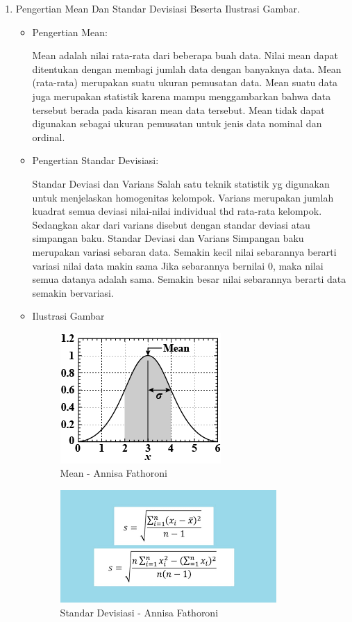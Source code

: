 \begin{enumerate}
\begin{itemize}
\end{itemize}

\item Pengertian Mean Dan Standar Devisiasi Beserta Ilustrasi Gambar.
\begin{itemize}
\item  Pengertian Mean:

Mean adalah nilai rata-rata dari beberapa buah data. Nilai mean dapat ditentukan dengan membagi jumlah data dengan banyaknya data. Mean (rata-rata) merupakan suatu ukuran pemusatan data. Mean suatu data juga merupakan statistik karena mampu menggambarkan bahwa data tersebut berada pada kisaran mean data tersebut. Mean tidak dapat digunakan sebagai ukuran pemusatan untuk jenis data nominal dan ordinal.

\item  Pengertian Standar Devisiasi:

Standar Deviasi dan Varians Salah satu teknik statistik yg digunakan untuk menjelaskan homogenitas kelompok. Varians merupakan jumlah kuadrat semua deviasi nilai-nilai individual thd rata-rata kelompok. Sedangkan akar dari varians disebut dengan standar deviasi atau simpangan baku. Standar Deviasi dan Varians Simpangan baku merupakan variasi sebaran data. Semakin kecil nilai sebarannya berarti variasi nilai data makin sama Jika sebarannya bernilai 0, maka nilai semua datanya adalah sama. Semakin besar nilai sebarannya berarti data semakin bervariasi.

\item Ilustrasi Gambar

\begin{figure}[!hbtp]
\centering
\includegraphics[scale=0.7]{figures/Chapter5AnnisaFathoroni2.png}
\caption{Mean - Annisa Fathoroni}
\label{Mean - Annisa Fathoroni}
\end{figure}

\begin{figure}[!hbtp]
\centering
\includegraphics[scale=0.7]{figures/Chapter5AnnisaFathoroni3.png}
\caption{Standar Devisiasi - Annisa Fathoroni}
\label{Standar Devisiasi - Annisa Fathoroni}
\end{figure}


\end{itemize}
\end{enumerate}
